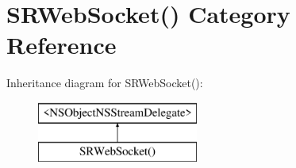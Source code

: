 \hypertarget{category_s_r_web_socket_07_08}{\section{S\-R\-Web\-Socket() Category Reference}
\label{category_s_r_web_socket_07_08}
}
Inheritance diagram for S\-R\-Web\-Socket()\-:\begin{figure}[H]
\begin{center}
\leavevmode
\includegraphics[height=2.000000cm]{category_s_r_web_socket_07_08}
\end{center}
\end{figure}
